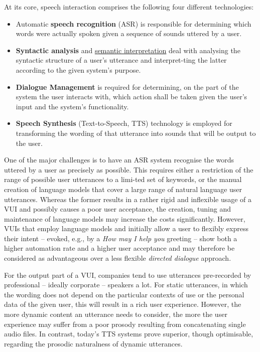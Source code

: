 \begin{multicols}{2}
At its core, speech interaction comprises the following four different technologies:
\begin{itemize}
\item Automatic \textbf{speech recognition} (ASR) is responsible for determining which words were actually spoken given a sequence of sounds uttered by a user.
\item \textbf{Syntactic analysis} and \underline{semantic interpretation} deal with analysing the syntactic structure of a user’s utterance and interpret-ting the latter according to the given system’s purpose.
\item \textbf{Dialogue Management} is required for determining, on the part of the system the user interacts with, which action shall be taken given the user’s input and the system’s functionality.
\item \textbf{Speech Synthesis} (Text-to-Speech, TTS) technology is employed for transforming the wording of that utterance into sounds that will be output to the user. 
\end{itemize}
One of the major challenges is to have an ASR system recognise the words uttered by a user as precisely as possible. This requires either a restriction of the range of possible user utterances to a limi-ted set of keywords, or the manual creation of language models that cover a large range of natural language user utterances. Whereas the former results in a rather rigid and inflexible usage of a VUI and possibly causes a poor user acceptance, the creation, tuning and maintenance of language models may increase the costs significantly. However, VUIs that employ language models and initially allow a user to flexibly express their intent – evoked, e.g., by a \textit{How may I help you} greeting – show both a higher automation rate and a higher user acceptance and may therefore be considered as advantageous over a less flexible \textit{directed dialogue} approach.

For the output part of a VUI, companies tend to use utterances pre-recorded by professional – ideally corporate – speakers a lot. For static utterances, in which the wording does not depend on the particular contexts of use or the personal data of the given user, this will result in a rich user experience. However, the more dynamic content an utterance needs to consider, the more the user experience may suffer from a poor prosody resulting from concatenating single audio files. In contrast, today’s TTS systems prove superior, though optimisable, regarding the prosodic naturalness of dynamic utterances.  


\end{multicols}
